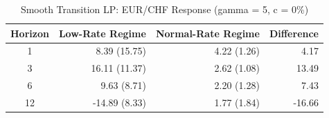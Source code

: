 \begin{table}[ht]
\centering
\caption{Smooth Transition LP: EUR/CHF Response (gamma = 5, c = 0\%)} 
\label{tab:smooth_transition_results}
\begin{tabular}{crrr}
  \toprule
Horizon & Low-Rate Regime & Normal-Rate Regime & Difference \\ 
  \midrule
  1 & 8.39 (15.75) & 4.22 (1.26) & 4.17 \\ 
    3 & 16.11 (11.37) & 2.62 (1.08) & 13.49 \\ 
    6 & 9.63 (8.71) & 2.20 (1.28) & 7.43 \\ 
   12 & -14.89 (8.33) & 1.77 (1.84) & -16.66 \\ 
   \bottomrule
\end{tabular}
\end{table}
